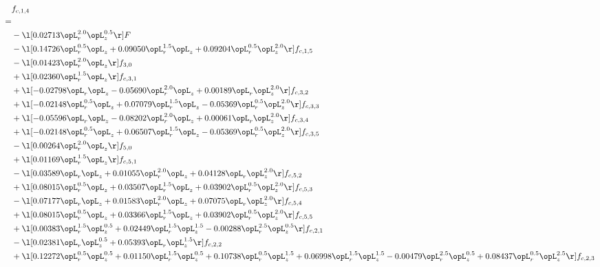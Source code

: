\begin{alignat}{2} 
\label{eq:f_14_2} 
& f_{c,1,4} \nonumber \\ 
 = \\ 
& - \l[  0.02713 \opL_r^{2.0} \opL_z^{0.5}  \r] F \nonumber \\ 
& - \l[  0.14726 \opL_r^{0.5} \opL_z +  0.09050 \opL_r^{1.5} \opL_z +  0.09204 \opL_r^{0.5} \opL_z^{2.0}  \r] f_{c,1,5} \nonumber \\ 
& - \l[  0.01423 \opL_r^{2.0} \opL_z  \r] f_{3,0} \nonumber \\ 
& + \l[  0.02360 \opL_r^{1.5} \opL_z  \r] f_{c,3,1} \nonumber \\ 
& + \l[  -0.02798 \opL_r \opL_z   -0.05690 \opL_r^{2.0} \opL_z +  0.00189 \opL_r \opL_z^{2.0}  \r] f_{c,3,2} \nonumber \\ 
& + \l[  -0.02148 \opL_r^{0.5} \opL_z +  0.07079 \opL_r^{1.5} \opL_z   -0.05369 \opL_r^{0.5} \opL_z^{2.0}  \r] f_{c,3,3} \nonumber \\ 
& + \l[  -0.05596 \opL_r \opL_z   -0.08202 \opL_r^{2.0} \opL_z +  0.00061 \opL_r \opL_z^{2.0}  \r] f_{c,3,4} \nonumber \\ 
& + \l[  -0.02148 \opL_r^{0.5} \opL_z +  0.06507 \opL_r^{1.5} \opL_z   -0.05369 \opL_r^{0.5} \opL_z^{2.0}  \r] f_{c,3,5} \nonumber \\ 
& - \l[  0.00264 \opL_r^{2.0} \opL_z  \r] f_{5,0} \nonumber \\ 
& + \l[  0.01169 \opL_r^{1.5} \opL_z  \r] f_{c,5,1} \nonumber \\ 
& - \l[  0.03589 \opL_r \opL_z +  0.01055 \opL_r^{2.0} \opL_z +  0.04128 \opL_r \opL_z^{2.0}  \r] f_{c,5,2} \nonumber \\ 
& + \l[  0.08015 \opL_r^{0.5} \opL_z +  0.03507 \opL_r^{1.5} \opL_z +  0.03902 \opL_r^{0.5} \opL_z^{2.0}  \r] f_{c,5,3} \nonumber \\ 
& - \l[  0.07177 \opL_r \opL_z +  0.01583 \opL_r^{2.0} \opL_z +  0.07075 \opL_r \opL_z^{2.0}  \r] f_{c,5,4} \nonumber \\ 
& + \l[  0.08015 \opL_r^{0.5} \opL_z +  0.03366 \opL_r^{1.5} \opL_z +  0.03902 \opL_r^{0.5} \opL_z^{2.0}  \r] f_{c,5,5} \nonumber \\ 
& + \l[  0.00383 \opL_r^{1.5} \opL_z^{0.5} +  0.02449 \opL_r^{1.5} \opL_z^{1.5}   -0.00288 \opL_r^{2.5} \opL_z^{0.5}  \r] f_{c,2,1} \nonumber \\ 
& - \l[  0.02381 \opL_r \opL_z^{0.5} +  0.05393 \opL_r \opL_z^{1.5}  \r] f_{c,2,2} \nonumber \\ 
& + \l[  0.12272 \opL_r^{0.5} \opL_z^{0.5} +  0.01150 \opL_r^{1.5} \opL_z^{0.5} +  0.10738 \opL_r^{0.5} \opL_z^{1.5} +  0.06998 \opL_r^{1.5} \opL_z^{1.5}   -0.00479 \opL_r^{2.5} \opL_z^{0.5} +  0.08437 \opL_r^{0.5} \opL_z^{2.5}  \r] f_{c,2,3} \nonumber \\ 

\end{alignat}
